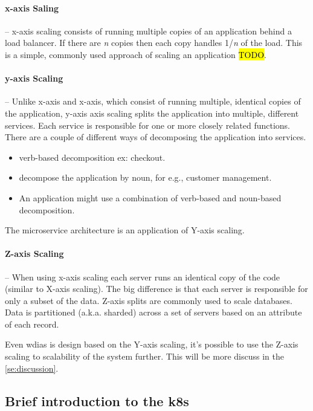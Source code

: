 \paragraph{x-axis Saling}-- x-axis scaling consists of running multiple copies of an application behind a load balancer. If there are \textit{n} copies then each copy handles 1/\textit{n} of the load. This is a simple, commonly used approach of scaling an application \hl{TODO}.

\paragraph{y-axis Scaling}-- Unlike x-axis and x-axis, which consist of running multiple, identical copies of the application, y-axis axis scaling splits the application into multiple, different services. Each service is responsible for one or more closely related functions. There are a couple of different ways of decomposing the application into services.
\begin{itemize}
    \item verb-based decomposition ex: checkout.
    \item decompose the application by noun, for e.g., customer management. 
    \item An application might use a combination of verb-based and noun-based decomposition.
\end{itemize}
    
The microservice architecture is an application of Y-axis scaling.

\paragraph{Z-axis Scaling}-- When using x-axis scaling each server runs an identical copy of the code (similar to X-axis scaling). The big difference is that each server is responsible for only a subset of the data. 
Z-axis splits are commonly used to scale databases. Data is partitioned (a.k.a. sharded) across a set of servers based on an attribute of each record.

Even \acrshort{wdias} is design based on the Y-axis scaling, it's possible to use the Z-axis scaling to scalability of the system further. This will be more discuss in the \cref{se:discussion}.

\subsection{Brief introduction to the \acrfull{k8s}}
\label{sebse:k8s_intro}

